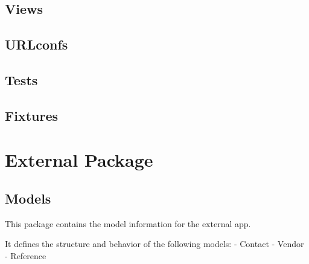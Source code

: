 \documentclass[letterpaper,10pt,english]{sphinxmanual}
\begin{document}
\subsection{Views}
\label{api:id7}\label{api:module-experimentdb.cloning.views}

\subsection{URLconfs}
\label{api:id8}\label{api:module-experimentdb.cloning.urls}

\subsection{Tests}
\label{api:id9}

\subsection{Fixtures}
\label{api:id10}

\section{External Package}
\label{api:module-experimentdb.external}\label{api:external-package}

\subsection{Models}
\label{api:id11}\label{api:module-experimentdb.external.models}
This package contains the model information for the external app.


It defines the structure and behavior of the following models:
- Contact
- Vendor
- Reference

\end{document}
